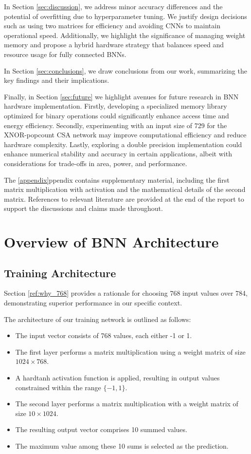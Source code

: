 \documentclass[conference]{IEEEtran}
\newcounter{todocount}
\newcommand{\todo}[1]{
  \stepcounter{todocount}
}
\begin{document}
In Section \ref{sec:discussion}, we address minor accuracy differences and the potential of overfitting due to hyperparameter tuning. We justify design decisions such as using two matrices for efficiency and avoiding CNNs to maintain operational speed. Additionally, we highlight the significance of managing weight memory and propose a hybrid hardware strategy that balances speed and resource usage for fully connected BNNs.

In Section \ref{sec:conclusions}, we draw conclusions from our work, summarizing the key findings and their implications.

Finally, in Section \ref{sec:future} we highlight avenues for future research in BNN hardware implementation. Firstly, developing a specialized memory library optimized for binary operations could significantly enhance access time and energy efficiency. Secondly, experimenting with an input size of 729 for the XNOR-popcount CSA network may improve computational efficiency and reduce hardware complexity. Lastly, exploring a double precision implementation could enhance numerical stability and accuracy in certain applications, albeit with considerations for trade-offs in area, power, and performance.

The \ref{appendix}ppendix contains supplementary material, including the first matrix multiplication with activation and the mathematical details of the second matrix. References to relevant literature are provided at the end of the report to support the discussions and claims made throughout.


\todo{written table of contents for coming sections -> DONE}

\section{Overview of BNN Architecture}
\label{sec:overview}
\subsection{Training Architecture}
Section \autoref{ref:why_768} provides a rationale for choosing 768 input values over 784, demonstrating superior performance in our specific context.

The architecture of our training network is outlined as follows:
\begin{itemize}
    \item The input vector consists of 768 values, each either -1 or 1.
    \item The first layer performs a matrix multiplication using a weight matrix of size \(1024 \times 768\).
    \item A hardtanh activation function is applied, resulting in output values constrained within the range \(\{-1, 1\}\).
    \item The second layer performs a matrix multiplication with a weight matrix of size \(10 \times 1024\).
    \item The resulting output vector comprises 10 summed values.
    \item The maximum value among these 10 sums is selected as the prediction.
\end{itemize}
\end{document}
